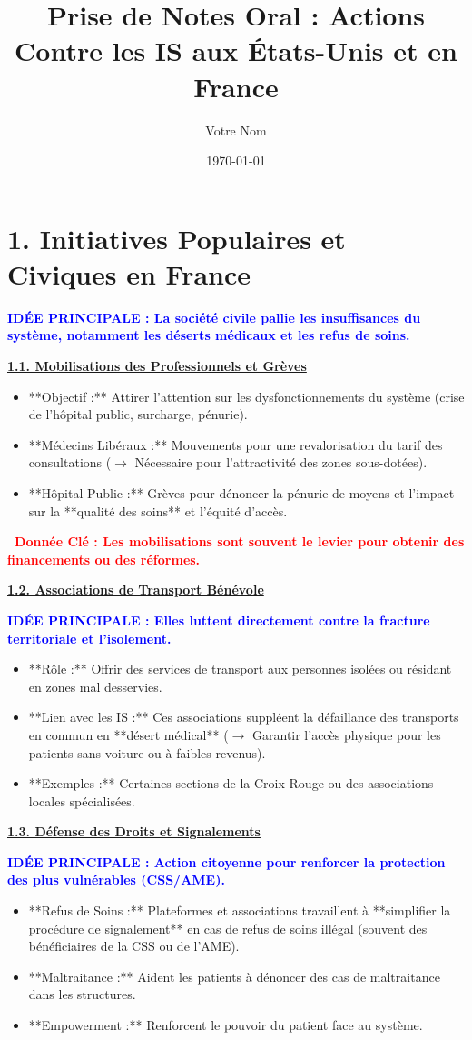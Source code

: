 \documentclass[10pt, a4paper]{article}
\title{\textbf{Prise de Notes Oral : Actions Contre les IS aux États-Unis et en France}}
\author{Votre Nom}
\date{\today}
\newcommand{\IdeeP}[1]{\noindent\textbf{\textcolor{blue}{IDÉE PRINCIPALE : #1}}\par}
\newcommand{\ChiffreCle}[1]{\noindent\textbf{\textcolor{red}{\textbullet\ Donnée Clé : #1}}\par}
\newcommand{\SousAxe}[1]{\vspace{0.5em}\noindent\underline{\textbf{#1}}\par}
\begin{document}
\maketitle
\thispagestyle{empty} %
\section*{1. Initiatives Populaires et Civiques en France}

\IdeeP{La société civile pallie les insuffisances du système, notamment les déserts médicaux et les refus de soins.}

\SousAxe{1.1. Mobilisations des Professionnels et Grèves}
\begin{itemize}
\item **Objectif :** Attirer l'attention sur les dysfonctionnements du système (crise de l'hôpital public, surcharge, pénurie).
\item **Médecins Libéraux :** Mouvements pour une revalorisation du tarif des consultations ($\to$ Nécessaire pour l'attractivité des zones sous-dotées).
\item **Hôpital Public :** Grèves pour dénoncer la pénurie de moyens et l'impact sur la **qualité des soins** et l'équité d'accès.
\end{itemize}
\ChiffreCle{Les mobilisations sont souvent le levier pour obtenir des financements ou des réformes.}

\SousAxe{1.2. Associations de Transport Bénévole}
\IdeeP{Elles luttent directement contre la fracture territoriale et l'isolement.}
\begin{itemize}
\item **Rôle :** Offrir des services de transport aux personnes isolées ou résidant en zones mal desservies.
\item **Lien avec les IS :** Ces associations suppléent la défaillance des transports en commun en **désert médical** ($\to$ Garantir l'accès physique pour les patients sans voiture ou à faibles revenus).
\item **Exemples :** Certaines sections de la Croix-Rouge ou des associations locales spécialisées.
\end{itemize}

\SousAxe{1.3. Défense des Droits et Signalements}
\IdeeP{Action citoyenne pour renforcer la protection des plus vulnérables (CSS/AME).}
\begin{itemize}
\item **Refus de Soins :** Plateformes et associations travaillent à **simplifier la procédure de signalement** en cas de refus de soins illégal (souvent des bénéficiaires de la CSS ou de l'AME).
\item **Maltraitance :** Aident les patients à dénoncer des cas de maltraitance dans les structures.
\item **Empowerment :** Renforcent le pouvoir du patient face au système.
\end{itemize}
\end{document}
